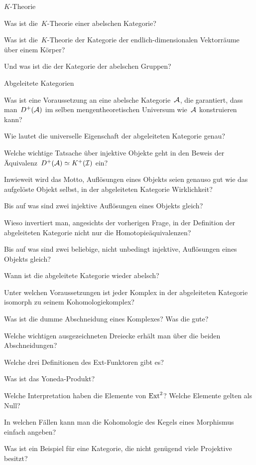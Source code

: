 \documentclass{uebblatt}
\begin{document}
\begin{aufgabeE}{$K$-Theorie}
\item Was ist die~$K$-Theorie einer abelschen Kategorie?
\item Was ist die~$K$-Theorie der Kategorie der endlich-dimensionalen
Vektorräume über einem Körper?
\item Und was ist die der Kategorie der abelschen Gruppen?
\end{aufgabeE}

\begin{aufgabeE}{Abgeleitete Kategorien}
\item Was ist eine Voraussetzung an eine abelsche Kategorie~$\mathcal{A}$, die
garantiert, dass man~$D^+(\mathcal{A})$ im selben mengentheoretischen Universum wie~$\mathcal{A}$
konstruieren kann?
\item Wie lautet die universelle Eigenschaft der abgeleiteten Kategorie
genau?
\item Welche wichtige Tatsache über injektive Objekte geht in den Beweis der
Äquivalenz~$D^+(\mathcal{A}) \simeq K^+(\mathcal{I})$ ein?
\item Inwieweit wird das Motto, Auflösungen eines Objekts seien genauso gut wie
das aufgelöste Objekt selbst, in der abgeleiteten Kategorie Wirklichkeit?
\item Bis auf was sind zwei injektive Auflösungen eines Objekts gleich?
\item Wieso invertiert man, angesichts der vorherigen Frage, in der Definition
der abgeleiteten Kategorie nicht nur die Homotopieäquivalenzen?
\item Bis auf was sind zwei beliebige, nicht unbedingt injektive, Auflösungen
eines Objekts gleich?
\item Wann ist die abgeleitete Kategorie wieder abelsch?
\item Unter welchen Voraussetzungen ist jeder Komplex in der abgeleiteten
Kategorie isomorph zu seinem Kohomologiekomplex?
\item Was ist die dumme Abschneidung eines Komplexes? Was die gute?
\item Welche wichtigen ausgezeichneten Dreiecke erhält man über die beiden
Abschneidungen?
\item Welche drei Definitionen des Ext-Funktoren gibt es?
\item Was ist das Yoneda-Produkt?
\item Welche Interpretation haben die Elemente von $\mathrm{Ext}^2$? Welche Elemente
gelten als Null?
\item In welchen Fällen kann man die Kohomologie des Kegels eines Morphismus
einfach angeben?
\item Was ist ein Beispiel für eine Kategorie, die nicht genügend viele
Projektive besitzt?
\end{aufgabeE}
\end{document}
